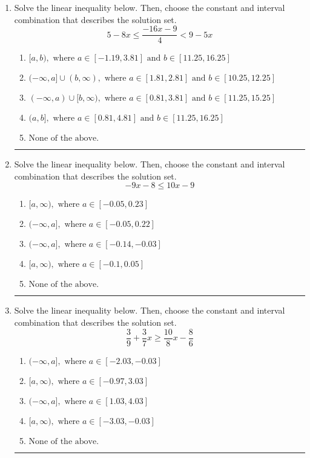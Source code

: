 \documentclass[14pt]{extbook}
\newcommand{\litem}[1]{\item#1\hspace*{-1cm}\rule{\textwidth}{0.4pt}}
\begin{document}
\begin{enumerate}
\litem{
Solve the linear inequality below. Then, choose the constant and interval combination that describes the solution set.\[ 5 - 8 x \leq \frac{-16 x - 9}{4} < 9 - 5 x \]\begin{enumerate}[label=\Alph*.]
\item \( [a, b), \text{ where } a \in [-1.19, 3.81] \text{ and } b \in [11.25, 16.25] \)
\item \( (-\infty, a] \cup (b, \infty), \text{ where } a \in [1.81, 2.81] \text{ and } b \in [10.25, 12.25] \)
\item \( (-\infty, a) \cup [b, \infty), \text{ where } a \in [0.81, 3.81] \text{ and } b \in [11.25, 15.25] \)
\item \( (a, b], \text{ where } a \in [0.81, 4.81] \text{ and } b \in [11.25, 16.25] \)
\item \( \text{None of the above.} \)

\end{enumerate} }
\litem{
Solve the linear inequality below. Then, choose the constant and interval combination that describes the solution set.\[ -9x -8 \leq 10x -9 \]\begin{enumerate}[label=\Alph*.]
\item \( [a, \infty), \text{ where } a \in [-0.05, 0.23] \)
\item \( (-\infty, a], \text{ where } a \in [-0.05, 0.22] \)
\item \( (-\infty, a], \text{ where } a \in [-0.14, -0.03] \)
\item \( [a, \infty), \text{ where } a \in [-0.1, 0.05] \)
\item \( \text{None of the above}. \)

\end{enumerate} }
\litem{
Solve the linear inequality below. Then, choose the constant and interval combination that describes the solution set.\[ \frac{3}{9} + \frac{3}{7} x \geq \frac{10}{8} x - \frac{8}{6} \]\begin{enumerate}[label=\Alph*.]
\item \( (-\infty, a], \text{ where } a \in [-2.03, -0.03] \)
\item \( [a, \infty), \text{ where } a \in [-0.97, 3.03] \)
\item \( (-\infty, a], \text{ where } a \in [1.03, 4.03] \)
\item \( [a, \infty), \text{ where } a \in [-3.03, -0.03] \)
\item \( \text{None of the above}. \)


\end{enumerate}}
\end{enumerate}
\end{document}
